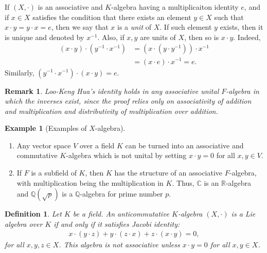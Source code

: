 \documentclass[11pt]{book}
\newtheorem{definition}{Definition}[chapter]
\newtheorem{remark}{Remark}[chapter]
\theoremstyle{definition}
\newtheorem{example}{Example}[chapter]
\numberwithin{equation}{chapter}
\begin{document}
If $(X,\cdot)$ is an associative and $K$-algebra having a multiplicaiton identity $e$, and if $x\in X$ satisfies the condition that there exists an element $y\in X$ such that $x\cdot y = y\cdot x = e$, then we say that $x$ is a \emph{unit} of $X$. If such element $y$ exists, then it is unique and denoted by $x^{-1}$. Also, if $x,y$ are units of $X$, then so is $x\cdot y$. Indeed,
\begin{align*}
    (x\cdot y)\cdot \left(y^{-1}\cdot x^{-1}\right) & = \left(x\cdot \left(y\cdot y^{-1}\right)\right)\cdot x^{-1} \\
    & = (x\cdot e)\cdot x^{-1} = e.
\end{align*}
Similarly, $\left(y^{-1}\cdot x^{-1}\right)\cdot(x\cdot y) = e$. 
\begin{remark}{\rm \cite{2}}
Loo-Keng Hua’s identity holds in any associative unital $F$-algebra in which the inverses exist, since the proof relies only on associativity of addition and multiplication and distributivity of multiplication over addition.
\end{remark}

\medskip

\begin{example}[Examples of $X$-algebra]
~\begin{enumerate}[label=(\arabic*)]
    \item Any vector space $V$ over a field $K$ can be turned into an associative and commutative $K$-algebra which is not unital by setting $x\cdot y = 0$ for all $x,y\in V$.
    \item If $F$ is a subfield of $K$, then $K$ has the structure of an associative $F$-algebra, with multiplication being the multiplication in $K$. Thus, $\mathbb{C}$ is an $\mathbb{R}$-algebra and $\mathbb{Q}(\sqrt{p})$ is a $\mathbb{Q}$-algebra for prime number $p$.
\end{enumerate}
\end{example}

\medskip

\begin{definition}
Let $K$ be a field. An anticommutative $K$-algebra $(X,\cdot)$ is a Lie algebra over $K$ if and only if it satisfies Jacobi identity:
\begin{align*}
    x\cdot (y\cdot z) + y\cdot (z\cdot x) + z\cdot (x\cdot y) = 0,
\end{align*}
for all $x,y,z\in X$. This algebra is not associative unless $x\cdot y = 0$ for all $x,y\in X$.
\end{definition}
\end{document}
